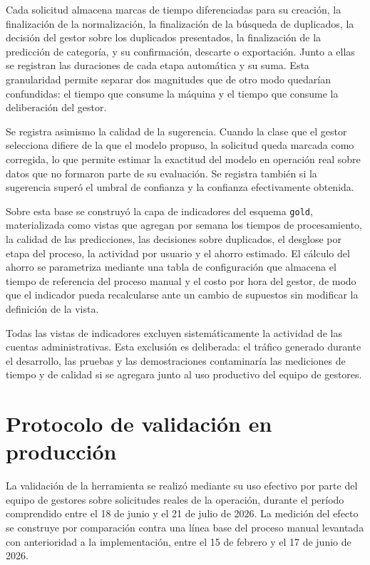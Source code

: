 Cada solicitud almacena marcas de tiempo diferenciadas para su creación, la finalización de la normalización, la finalización de la búsqueda de duplicados, la decisión del gestor sobre los duplicados presentados, la finalización de la predicción de categoría, y su confirmación, descarte o exportación. Junto a ellas se registran las duraciones de cada etapa automática y su suma. Esta granularidad permite separar dos magnitudes que de otro modo quedarían confundidas: el tiempo que consume la máquina y el tiempo que consume la deliberación del gestor.

Se registra asimismo la calidad de la sugerencia. Cuando la clase que el gestor selecciona difiere de la que el modelo propuso, la solicitud queda marcada como corregida, lo que permite estimar la exactitud del modelo en operación real sobre datos que no formaron parte de su evaluación. Se registra también si la sugerencia superó el umbral de confianza y la confianza efectivamente obtenida.

Sobre esta base se construyó la capa de indicadores del esquema \texttt{gold}, materializada como vistas que agregan por semana los tiempos de procesamiento, la calidad de las predicciones, las decisiones sobre duplicados, el desglose por etapa del proceso, la actividad por usuario y el ahorro estimado. El cálculo del ahorro se parametriza mediante una tabla de configuración que almacena el tiempo de referencia del proceso manual y el costo por hora del gestor, de modo que el indicador pueda recalcularse ante un cambio de supuestos sin modificar la definición de la vista.

Todas las vistas de indicadores excluyen sistemáticamente la actividad de las cuentas administrativas. Esta exclusión es deliberada: el tráfico generado durante el desarrollo, las pruebas y las demostraciones contaminaría las mediciones de tiempo y de calidad si se agregara junto al uso productivo del equipo de gestores.

\section{Protocolo de validación en producción}
La validación de la herramienta se realizó mediante su uso efectivo por parte del equipo de gestores sobre solicitudes reales de la operación, durante el período comprendido entre el 18 de junio y el 21 de julio de 2026. La medición del efecto se construye por comparación contra una línea base del proceso manual levantada con anterioridad a la implementación, entre el 15 de febrero y el 17 de junio de 2026.

